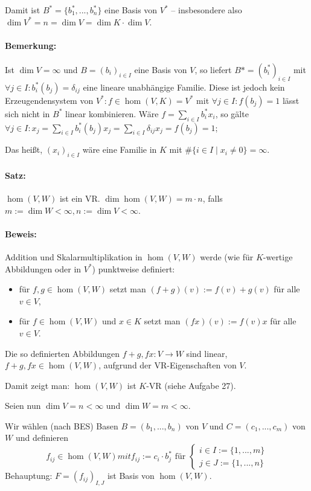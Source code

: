 	Damit ist $ B^* = \{b_1^*,...,b_n^*\}$ eine Basis von $ V^* $ -- insbesondere also $ \dim V^* = n = \dim V = \dim K\cdot \dim V $.
	
\paragraph{Bemerkung:}
	Ist $\dim V = \infty$ und $B=(b_i)_{i\in I}$ eine Basis von $V$, so liefert $B\ast=(b_i^\ast)_{i\in I}$ mit $\forall j\in I:b_i^\ast(b_j)=\delta_{ij}$ eine lineare unabhängige Familie. Diese ist jedoch kein Erzeugendensystem von $V^\ast: f\in\hom(V,K)=V^\ast$ mit $\forall j\in I:f(b_j)=1$ lässt sich nicht in $B^\ast$ linear kombinieren. Wäre $f=\sum_{i\in I}b_i^\ast x_i$, so gälte $\forall j\in I: x_j =\sum_{i\in I}b_i^\ast(b_j)x_j= \sum_{i\in I} \delta_{ij}x_j = f(b_j) = 1$; 

	Das heißt, $(x_i)_{i\in I}$ wäre eine Familie in $ K $ mit $\#\{i\in I\mid x_i\neq 0\}=\infty$.

\paragraph{Satz:}
	$ \hom (V,W) $ ist ein VR. $\dim\hom (V,W) = m\cdot n$, falls $m:=\dim W<\infty, n:=\dim V< \infty$.
	
\paragraph{Beweis:}
	Addition und Skalarmultiplikation in $\hom (V,W)$ werde (wie für $K$-wertige Abbildungen oder in $V^*$) punktweise definiert:
	\begin{itemize}
		\item für $f,g \in \hom (V,W)$ setzt man $(f+g)(v) := f(v) + g(v)$ für alle $v\in V$,
		\item für $f\in \hom (V,W)$ und $x\in K$ setzt man $(fx)(v) := f(v)x$ für alle $v\in V$.
	\end{itemize}
	Die so definierten Abbildungen $f+g,fx: V\to W$ sind linear, $f+g, fx\in \hom (V,W)$, aufgrund der VR-Eigenschaften von $V$.
	
	Damit zeigt man: $\hom (V,W)$ ist $K$-VR (siehe Aufgabe 27).
	
	Seien nun $\dim V = n < \infty$ und $\dim W = m < \infty$.
	
	Wir wählen (nach BES) Basen $B = (b_1,...,b_n)$ von $V$ und $C=(c_1,...,c_m)$ von $W$ und definieren
		\begin{equation*}
			f_{ij}\in \hom (V,W) mit f_{ij}:= c_i\cdot b_j^* \text{ für } 
				\begin{cases}
					i\in I := \{1,...,m\}\\
					j\in J := \{1,...,n\}
				\end{cases}
		\end{equation*}
	Behauptung: $F=(f_{ij})_{I,J}$ ist Basis von $\hom (V,W)$.
	
